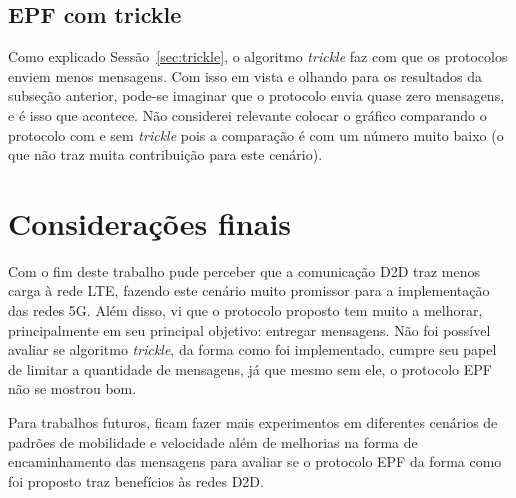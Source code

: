 \documentclass[11pt,a4paper,titlepage]{article}
\begin{document}
\subsection{EPF com trickle}\label{subsec:epftrickle}

Como explicado Sessão~\ref{sec:trickle}, o algoritmo \textit{trickle} faz com que os protocolos enviem menos mensagens.
Com isso em vista e olhando para os resultados da subseção anterior, pode-se imaginar que o protocolo envia quase zero mensagens, e é isso que acontece.
Não considerei relevante colocar o gráfico comparando o protocolo com e sem \textit{trickle} pois a comparação é com um número muito baixo (o que não traz muita contribuição para este cenário).

\section{Considerações finais}\label{sec-consideracoes}

Com o fim deste trabalho pude perceber que a comunicação D2D traz menos carga à rede LTE, fazendo este cenário muito promissor para a implementação das redes 5G.
Além disso, vi que o protocolo proposto tem muito a melhorar, principalmente em seu principal objetivo: entregar mensagens.
Não foi possível avaliar se algoritmo \textit{trickle}, da forma como foi implementado, cumpre seu papel de limitar a quantidade de mensagens, já que mesmo sem ele, o protocolo EPF não se mostrou bom.

Para trabalhos futuros, ficam fazer mais experimentos em diferentes cenários de padrões de mobilidade e velocidade além de melhorias na forma de encaminhamento das mensagens para avaliar se o protocolo EPF da forma como foi proposto traz benefícios às redes D2D.






%




\end{document}

